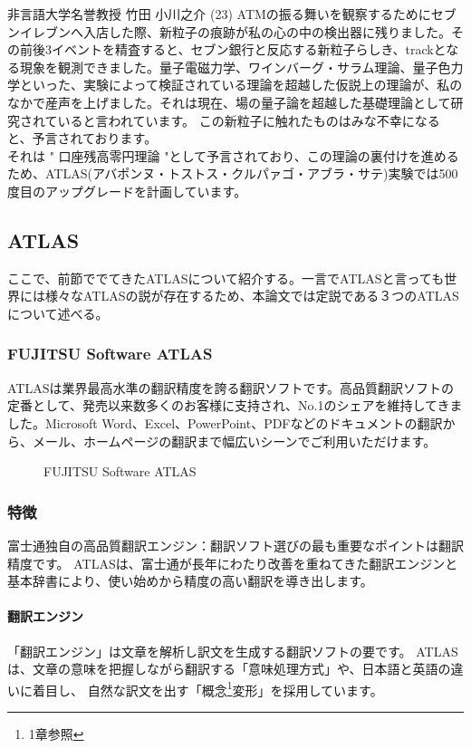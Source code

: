 \documentclass[12pt]{jsarticle}
\begin{document}
\begin{itembox}[c]{非言語大学名誉教授 竹田 小川之介 (23)}
ATMの振る舞いを観察するためにセブンイレブンへ入店した際、新粒子の痕跡が私の心の中の検出器に残りました。その前後3イベントを精査すると、セブン銀行と反応する新粒子らしき、trackとなる現象を観測できました。量子電磁力学、ワインバーグ・サラム理論、量子色力学といった、実験によって検証されている理論を超越した仮説上の理論が、私のなかで産声を上げました。それは現在、場の量子論を超越した基礎理論として研究されていると言われています。
この新粒子に触れたものはみな不幸になると、予言されております。\\
それは " 口座残高零円理論 "として予言されており、この理論の裏付けを進めるため、ATLAS(アバポンヌ・トストス・クルパァゴ・アブラ・サテ)実験では500度目のアップグレードを計画しています。
\end{itembox}

\newpage
\subsection{ATLAS}
ここで、前節ででてきたATLASについて紹介する。一言でATLASと言っても世界には様々なATLASの説が存在するため、本論文では定説である３つのATLASについて述べる。

\subsubsection{FUJITSU Software ATLAS}
ATLASは業界最高水準の翻訳精度を誇る翻訳ソフトです。高品質翻訳ソフトの定番として、発売以来数多くのお客様に支持され、No.1のシェアを維持してきました。Microsoft Word、Excel、PowerPoint、PDFなどのドキュメントの翻訳から、メール、ホームページの翻訳まで幅広いシーンでご利用いただけます。

\begin{figure}[H]
\centering
\caption{FUJITSU Software ATLAS}
\end{figure}

\subsubsection*{特徴}
富士通独自の高品質翻訳エンジン：翻訳ソフト選びの最も重要なポイントは翻訳精度です。 ATLASは、富士通が長年にわたり改善を重ねてきた翻訳エンジンと基本辞書により、使い始めから精度の高い翻訳を導き出します。
\paragraph{翻訳エンジン}
「翻訳エンジン」は文章を解析し訳文を生成する翻訳ソフトの要です。 ATLASは、文章の意味を把握しながら翻訳する「意味処理方式」や、日本語と英語の違いに着目し、 自然な訳文を出す「概念\footnote{1章参照}変形」を採用しています。
\end{document}
